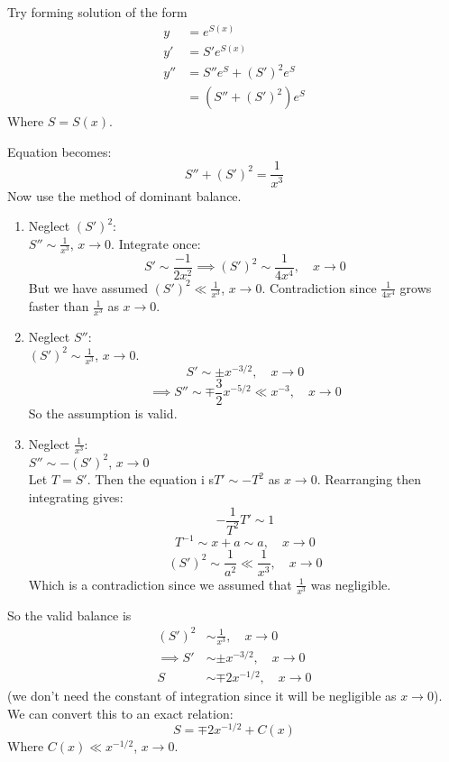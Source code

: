 \documentclass{/home/janmebows/Documents/LatexTemplates/myassignment}
\begin{document}
Try forming solution of the form
\begin{align*}
	y&=e^{S(x)}\\
	y'&=S' e^{S(x)}\\
	y''&= S'' e^{S} + (S')^2 e^S\\
	&= (S'' + (S')^2)e^S
\end{align*}
Where $S = S(x)$.

Equation becomes:
\[S'' + (S')^2 = \frac{1}{x^3}\]
Now use the method of dominant balance.

\begin{enumerate}
	\item Neglect $(S')^2$:\\
	$S'' \sim \frac{1}{x^3}$, $x\to 0$.
	Integrate once:
	\[S' \sim \frac{-1}{2x^2} \implies (S')^2 \sim \frac{1}{4x^4}, \quad x\to 0\]
	But we have assumed $(S')^2 \ll \frac{1}{x^3}$, $x\to 0$. Contradiction since $\frac{1}{4x^4}$ grows faster than $\frac{1}{x^3}$ as $x\to 0$.

	\item Neglect $S''$:\\
	$(S')^2 \sim \frac{1}{x^3}$, $x\to 0$.
	\[S' \sim \pm x^{-3/2}, \quad x\to 0\]
	\[\implies S'' \sim \mp \frac32 x^{-5/2} \ll x^{-3}, \quad x\to 0\]
	So the assumption is valid.\\


	\item Neglect $\frac{1}{x^3}$:\\
	$S'' \sim -(S')^2$, $x\to 0$\\
	Let $T= S'$. Then the equation i s$T' \sim -T^2$ as $x\to 0$. Rearranging then integrating gives:
	\[-\frac1{T^2} T' \sim 1\]
	\[T^{-1} \sim x+a \sim a, \quad x\to 0 \]
	\[(S')^2 \sim \frac{1}{a^2} \ll \frac{1}{x^3},\quad x\to 0\]
	Which is a contradiction since we assumed that $\frac{1}{x^3}$ was negligible.

\end{enumerate}


So the valid balance is
\begin{align*}
	(S')^2 &\sim \frac{1}{x^3}, \quad x\to 0\\
	\implies S' &\sim \pm x^{-3/2}, \quad x\to 0\\
	S &\sim \mp 2x^{-1/2}, \quad x\to 0
\end{align*}
(we don't need the constant of integration since it will be negligible as $x\to 0$).\\

We can convert this to an exact relation:
	\[S = \mp 2x^{-1/2} + C(x)\]
Where $C(x) \ll x^{-1/2}$, $x\to 0$.\\
\end{document}
